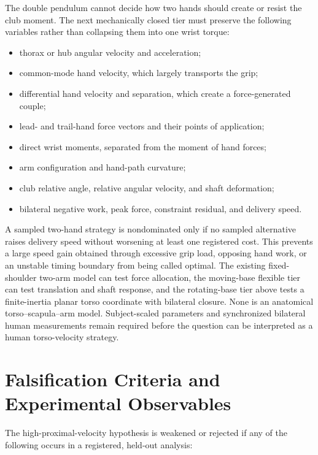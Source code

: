 \documentclass[
  letterpaper,
]{report}
\providecommand{\tightlist}{%
  \setlength{\itemsep}{0pt}\setlength{\parskip}{0pt}}
\begin{document}
The double pendulum cannot decide how two hands should create or resist
the club moment. The next mechanically closed tier must preserve the
following variables rather than collapsing them into one wrist torque:

\begin{itemize}
\tightlist
\item
  thorax or hub angular velocity and acceleration;
\item
  common-mode hand velocity, which largely transports the grip;
\item
  differential hand velocity and separation, which create a
  force-generated couple;
\item
  lead- and trail-hand force vectors and their points of application;
\item
  direct wrist moments, separated from the moment of hand forces;
\item
  arm configuration and hand-path curvature;
\item
  club relative angle, relative angular velocity, and shaft deformation;
\item
  bilateral negative work, peak force, constraint residual, and delivery
  speed.
\end{itemize}

A sampled two-hand strategy is nondominated only if no sampled
alternative raises delivery speed without worsening at least one
registered cost. This prevents a large speed gain obtained through
excessive grip load, opposing hand work, or an unstable timing boundary
from being called optimal. The existing fixed-shoulder two-arm model can
test force allocation, the moving-base flexible tier can test
translation and shaft response, and the rotating-base tier above tests a
finite-inertia planar torso coordinate with bilateral closure. None is
an anatomical torso--scapula--arm model. Subject-scaled parameters and
synchronized bilateral human measurements remain required before the
question can be interpreted as a human torso-velocity strategy.

\section{Falsification Criteria and Experimental
Observables}\label{falsification-criteria-and-experimental-observables}

The high-proximal-velocity hypothesis is weakened or rejected if any of
the following occurs in a registered, held-out analysis:
\end{document}
